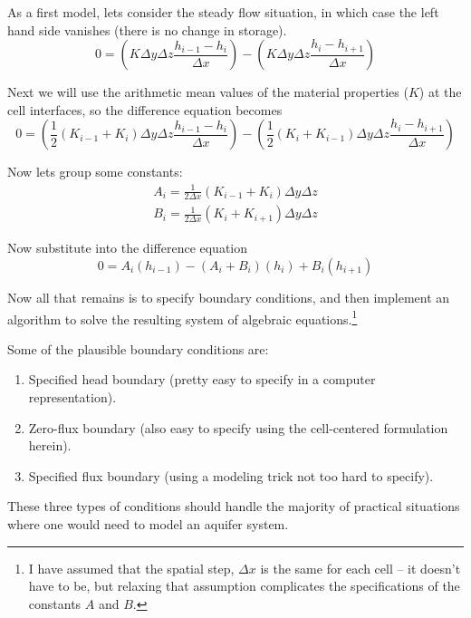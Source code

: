 As a first model, lets consider the steady flow situation, in which case the left hand side vanishes (there is no change in storage).
 \begin{equation}
0 = 
(K \Delta y \Delta z \frac{h_{i-1} - h_{i}}{\Delta x}) - 
(K \Delta y \Delta z \frac{h_{i} - h_{i+1}}{\Delta x})
\end{equation}

Next we will use the arithmetic mean values of the material properties ($K$) at the cell interfaces, so the difference equation becomes
 \begin{equation}
0 = 
(\frac{1}{2}(K_{i-1}+K_{i}) \Delta y \Delta z \frac{h_{i-1} - h_{i}}{\Delta x}) - 
(\frac{1}{2}(K_{i}+K_{i-1}) \Delta y \Delta z \frac{h_{i} - h_{i+1}}{\Delta x})
\end{equation}

Now lets group some constants:
\begin{equation}
\begin{matrix}
A_{i} = \frac{1}{2 \Delta x}(K_{i-1}+K_{i}) \Delta y \Delta z \\
B_{i} = \frac{1}{2 \Delta x}(K_{i}+K_{i+1}) \Delta y \Delta z
\end{matrix}
\end{equation}

Now substitute into the difference equation
 \begin{equation}
0 = A_{i}(h_{i-1}) -(A_{i}+B_{i})(h_{i}) + B_{i}(h_{i+1})
\end{equation}

Now all that remains is to specify boundary conditions, and then implement an algorithm to solve the resulting system of algebraic equations.\footnote{I have assumed that the spatial step, $\Delta x$ is the same for each cell -- it doesn't have to be, but relaxing that assumption complicates the specifications of the constants $A$ and $B$.}

Some of the plausible boundary conditions are:
\begin{enumerate}
\item Specified head boundary (pretty easy to specify in a computer representation).
\item Zero-flux boundary (also easy to specify using the cell-centered formulation herein).
\item Specified flux boundary (using a modeling trick not too hard to specify).
\end{enumerate}
These three types of conditions should handle the majority of practical situations where one would need to model an aquifer system.

